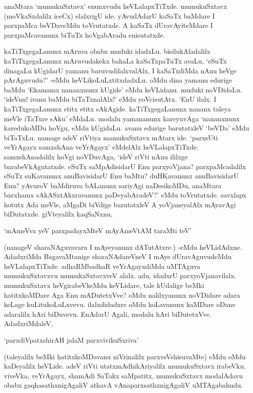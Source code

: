 anaMtara `mumukuSxtavx' enunxvudu heVLalapxTiTxde. mumukuSxtavx (moVkaSxdalilx iceCx) elalxrigU ide. yAvudAdarU kaSaTx baMdare I parxpaMca beVDaveMdu toVrutatxde. A kaSaTx dUravAyiteMdare I parxpaMcavanunx biTuTx hoVgabAradu enisutatxde.

kaTiTxgegaLanunx mAruva obabx muduki idadxLu. bisilukAladalilx kaTiTxgegaLanunx mAruvudakekx bahaLa kaSaTxpaTuTx avaLu, `eSuTx dinagaLu kUgidarU yamanu baruvudilalxvalAlx, I kaSaTxdiMda nAnu heVge pArAguvudu?' -eMdu heVLikoLuLxtitxdadxLu. oMdu dina yamanu edurige baMdu `Ekamamx nananxnunx kUgide' eMdu keVLidanu. muduki noVDidaLu. `ideVnu! ivanu baMdu biTaTxnalAlx!' eMdu yoVcisutAtx. `EnU ilalx. I kaTiTxgegaLanunx etitx etitx sAkAgide. kaTiTxgegaLanunx nananx taleya meVle iTaTxre sAku' eMdaLu. modalu yamananunx kareyuvAga `nananxnunx karedukoMDu hoVgu, eMdu kUgidaLu. avanu edurige barutatxleV `beVDa' eMdu biTaTxLu. namage adeV riVtiya mamukuSxtavx mAtarx ide. `parxsUti veYrAgayx samxshAna veYrAgayx' eMdelAlx heVLalapxTiTxde. samxshAnadalilx hoVgi noVDuvAga, `ideV riVti nAnu ililxge barabeVkAgutatxde. eSuTx saMpAdisidarU Enu parxyoVjana? parxpaMcadalilx eSuTx suKavanunx anuBavisidarU Enu baMtu? duHKavanunx anuBavisidarU Enu? yAvuroV baMdiruva bALanunx sariyAgi naDesikoMDu, anaMtara barxhamx sAkASxtAkxravanunx paDeyabAradeV?' eMdu toVrutatxde. savxlapx hotutx Ada meVle, aMgaDi biVdige barutatxleV A yoVjaneyalAlx mAyavAgi biDutatxde. giVteyalilx kaqSaNxnu,

\begin{shloka}
`mAmeVva yeV parxpadayxMteV mAyAmeVtAM taraMti teV'
\end{shloka}

(nanageV sharaNAguvavaru I mAyeyanunx dATutAtxre.) -eMdu heVLidAdxne. AdadxriMda BagavaMtanige sharaNAdareVneV I mAye dUravAguvudeMdu heVLalapxTiTxde. adhaRMbadhaR veYrAgayxdiMda uMTAguva mumukuSxtavxvu mumukaSxtavxveV alalx. adu, idadxrU parxyoVjanavilalx. mumukuSxtavx heVgirabeVkeMdu keVLidare, tale kUdalige beMki hatitxkoMDare Aga Enu mADutetxVve? oMdu nalilxyanunx noVDidare adara keLage kuLitukoLuLxvevu. ilalxdidadxre oMdu koLavanunx kaMDare oDane adaralilx hAri biDuvevu. EnAdarU Agali, modalu hAri biDutetxVve. AdadxriMdaleV,

\begin{shloka}
`parxdiVpatxshirAH jalaM parxvivikuSxriva'
\end{shloka}

(taleyalilx beMki hatitxkoMDavanu niVrinalilx parxveVshisuvaMte) eMdu oMdu kaDeyalilx heVLide. adeV riVti utatxmAdhikAriyalilx mumukuSxtavx irabeVku. viveVka, veYrAgayx, shamAdi SaTakx saMpatitx, mumukuSxtavx modalAdavu obabx gaqhasathxnigAgaliV athavA vAnaparxsathxnigAgaliV uMTAgabahudu.


